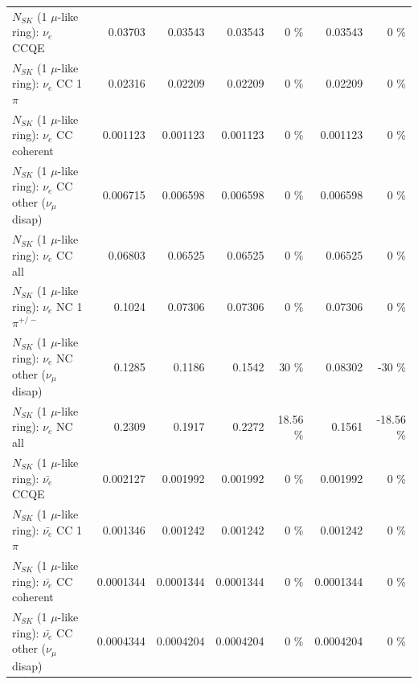 \begin{table}
\begin{tabular}{| l | r | r | r  r | r  r |}
\hline
\hline
\hline
                                      $N_{SK}$ (1 $\mu$-like ring): $\nu_e$ CCQE &         0.03703 &         0.03543 &         0.03543 &        0 \%  &         0.03543 &        0 \%  \\ 
                                 $N_{SK}$ (1 $\mu$-like ring): $\nu_e$ CC 1$\pi$ &         0.02316 &         0.02209 &         0.02209 &        0 \%  &         0.02209 &        0 \%  \\ 
                               $N_{SK}$ (1 $\mu$-like ring): $\nu_e$ CC coherent &        0.001123 &        0.001123 &        0.001123 &        0 \%  &        0.001123 &        0 \%  \\ 
                $N_{SK}$ (1 $\mu$-like ring): $\nu_e$ CC other ($\nu_\mu$ disap) &        0.006715 &        0.006598 &        0.006598 &        0 \%  &        0.006598 &        0 \%  \\ 
                                  $N_{SK}$ (1 $\mu$-like ring): $\nu_{e}$ CC all &         0.06803 &         0.06525 &         0.06525 &        0 \%  &         0.06525 &        0 \%  \\ 
\hline
                           $N_{SK}$ (1 $\mu$-like ring): $\nu_e$ NC 1$\pi^{+/-}$ &          0.1024 &         0.07306 &         0.07306 &        0 \%  &         0.07306 &        0 \%  \\ 
                $N_{SK}$ (1 $\mu$-like ring): $\nu_e$ NC other ($\nu_\mu$ disap) &          0.1285 &          0.1186 &          0.1542 &       30 \%  &         0.08302 &      -30 \%  \\ 
                                  $N_{SK}$ (1 $\mu$-like ring): $\nu_{e}$ NC all &          0.2309 &          0.1917 &          0.2272 &    18.56 \%  &          0.1561 &   -18.56 \%  \\ 
\hline
\hline
\hline
                                $N_{SK}$ (1 $\mu$-like ring): $\bar{\nu_e}$ CCQE &        0.002127 &        0.001992 &        0.001992 &        0 \%  &        0.001992 &        0 \%  \\ 
                           $N_{SK}$ (1 $\mu$-like ring): $\bar{\nu_e}$ CC 1$\pi$ &        0.001346 &        0.001242 &        0.001242 &        0 \%  &        0.001242 &        0 \%  \\ 
                         $N_{SK}$ (1 $\mu$-like ring): $\bar{\nu_e}$ CC coherent &       0.0001344 &       0.0001344 &       0.0001344 &        0 \%  &       0.0001344 &        0 \%  \\ 
          $N_{SK}$ (1 $\mu$-like ring): $\bar{\nu_e}$ CC other ($\nu_\mu$ disap) &       0.0004344 &       0.0004204 &       0.0004204 &        0 \%  &       0.0004204 &        0 \%  \\ 

\end{tabular}
\end{table}
